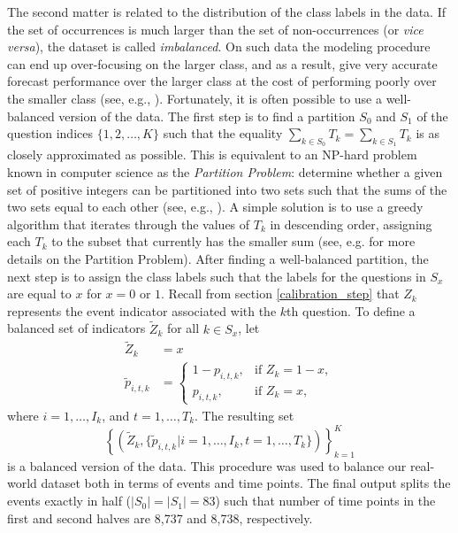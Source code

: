 \documentclass[aoas, preprint]{imsart}
\numberwithin{equation}{section}
\theoremstyle{plain}
\begin{document}
The second matter is related to the distribution of the class labels in the data. If the set of occurrences is much larger than the set of non-occurrences (or \textit{vice versa}), the dataset is called \textit{imbalanced}. On such data the modeling procedure can end up over-focusing on the larger class, and as a result, give very accurate forecast performance over the larger class at the cost of performing poorly over the smaller class (see, e.g., \citet{chen2009learning, wallace2012class}). Fortunately, it is often possible to use a well-balanced version of the data. The first step is to find a partition $S_0$ and $S_1$ of the question indices $\{1, 2, \dots, K\}$ such that the equality $\sum_{k \in S_0} T_k  = \sum_{k \in S_1} T_k$ is as closely approximated as possible. This is equivalent to an NP-hard problem known in computer science as the \textit{Partition Problem}:  determine whether a given set of positive integers can be partitioned into two sets such that the sums of the two sets equal to each other (see, e.g., \citet{karmarkar1982differencing, hayes2002easiest}). A simple solution is to use a greedy algorithm that iterates through the values of $T_k$ in descending order, assigning each $T_k$ to the subset that currently has the smaller sum (see, e.g. \citet{kellerer2004knapsack, gent1996phase} for more details on the Partition Problem). After finding a well-balanced partition, the next step is to assign the class labels such that the labels for the questions in $S_x$ are equal to $x$ for $x = 0$ or $1$. Recall from section \ref{calibration_step} that $Z_k$ represents the event indicator associated with the $k$th question. To define a balanced set of indicators $ \tilde{Z}_k$ for all $k \in S_x$, let
\begin{align*}
 \tilde{Z}_k &= x\\
\tilde{p}_{i,t,k} &=  \begin{cases} 
1-p_{i,t,k}, & \text{if } Z_k = 1-x,\\
p_{i,t,k}, & \text{if } Z_k = x,
\end{cases}
\end{align*}
where $i = 1, \dots, I_k$, and $t = 1, \dots, T_k$. The resulting set $$\left\{\left(\tilde{Z}_k, \{\tilde{p}_{i,t,k} | i = 1, \dots, I_k, t = 1, \dots, T_k \}\right) \right\}_{k=1}^K$$ is a balanced version of the data. 
This procedure was used to balance our real-world dataset both in terms of events and time points. The final output splits the events exactly in half ($|S_0| = |S_1| = 83$) such that number of time points in the first and second halves are 8,737 and 8,738, respectively. 
\end{document}
